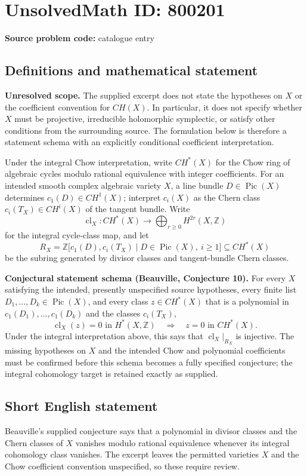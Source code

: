 \documentclass[11pt]{article}
\begin{document}
\section*{UnsolvedMath ID: 800201}
\textbf{Source problem code:} catalogue entry
\subsection{Definitions and mathematical statement}
\textbf{Unresolved scope.} The supplied excerpt does not state the hypotheses on \(X\) or the coefficient convention for \(CH(X)\). In particular, it does not specify whether \(X\) must be projective, irreducible holomorphic symplectic, or satisfy other conditions from the surrounding source. The formulation below is therefore a statement schema with an explicitly conditional coefficient interpretation.

Under the integral Chow interpretation, write \(CH^*(X)\) for the Chow ring of algebraic cycles modulo rational equivalence with integer coefficients. For an intended smooth complex algebraic variety \(X\), a line bundle \(D\in\operatorname{Pic}(X)\) determines \(c_1(D)\in CH^1(X)\); interpret \(c_i(X)\) as the Chern class \(c_i(T_X)\in CH^i(X)\) of the tangent bundle. Write
\[
\operatorname{cl}_X\colon CH^*(X)\longrightarrow\bigoplus_{r\geq 0}H^{2r}(X,\mathbb Z)
\]
for the integral cycle-class map, and let
\[
R_X=\mathbb Z\bigl[c_1(D),c_i(T_X)\mid D\in\operatorname{Pic}(X),\ i\geq 1\bigr]\subseteq CH^*(X)
\]
be the subring generated by divisor classes and tangent-bundle Chern classes.

\textbf{Conjectural statement schema (Beauville, Conjecture 10).} For every \(X\) satisfying the intended, presently unspecified source hypotheses, every finite list \(D_1,\ldots,D_k\in\operatorname{Pic}(X)\), and every class \(z\in CH^*(X)\) that is a polynomial in \(c_1(D_1),\ldots,c_1(D_k)\) and the classes \(c_i(T_X)\),
\[
\operatorname{cl}_X(z)=0\text{ in }H^*(X,\mathbb Z)
\quad\Longrightarrow\quad
z=0\text{ in }CH^*(X).
\]
Under the integral interpretation above, this says that \(\operatorname{cl}_X|_{R_X}\) is injective. The missing hypotheses on \(X\) and the intended Chow and polynomial coefficients must be confirmed before this schema becomes a fully specified conjecture; the integral cohomology target is retained exactly as supplied.
\subsection{Short English statement}
Beauville's supplied conjecture says that a polynomial in divisor classes and the Chern classes of \(X\) vanishes modulo rational equivalence whenever its integral cohomology class vanishes. The excerpt leaves the permitted varieties \(X\) and the Chow coefficient convention unspecified, so these require review.
\end{document}
